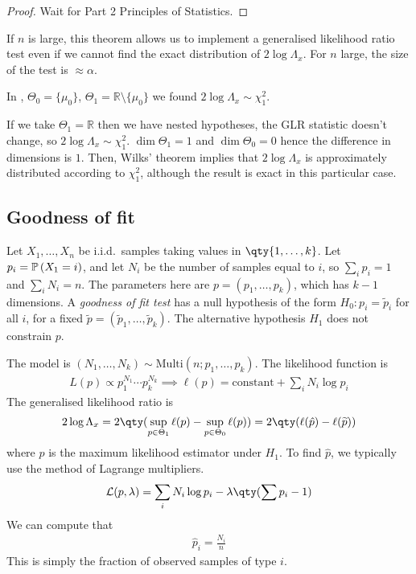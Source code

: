 \begin{proof}
	Wait for Part 2 Principles of Statistics.
\end{proof} 

\begin{remark}
	If $n$ is large, this theorem allows us to implement a generalised likelihood ratio test even if we cannot find the exact distribution of $2 \log \Lambda_x$.
	For $n$ large, the size of the test is $\approx \alpha$.
\end{remark}

\begin{example}
	In , $\Theta_0 = \{\mu_0\}$, $\Theta_1 = \mathbb{R} \setminus \{\mu_0\}$ we found $2 \log \Lambda_x \sim \chi_1^2$.

	If we take $\Theta_1 = \mathbb{R}$ then we have nested hypotheses, the GLR statistic doesn't change, so $2 \log \Lambda_x \sim \chi_1^2$.
	$\dim \Theta_1 = 1$ and $\dim \Theta_0 = 0$ hence the difference in dimensions is $1$.
	Then, Wilks' theorem implies that $2 \log \Lambda_x$ is approximately distributed according to $\chi_1^2$, although the result is exact in this particular case.
\end{example}

\subsection{Goodness of fit}
Let $X_1, \dots, X_n$ be i.i.d.\ samples taking values in $\qty{1, \dots, k}$.
Let $p_i = \mathbb{P}\left({X_1 = i}\right)$, and let $N_i$ be the number of samples equal to $i$, so $\sum_i p_i = 1$ and $\sum_i N_i = n$.
The parameters here are $p = (p_1, \dots, p_k)$, which has $k - 1$ dimensions.
A \textit{goodness of fit test} has a null hypothesis of the form $H_0 \colon p_i = \widetilde p_i$ for all $i$, for a fixed $\widetilde p = (\widetilde p_1, \dots, \widetilde p_k)$.
The alternative hypothesis $H_1$ does not constrain $p$.

The model is $(N_1, \dots, N_k) \sim \mathrm{Multi}(n; p_1, \dots, p_k)$.
The likelihood function is
\begin{align*}
	L(p) \propto p_1^{N_1} \cdots p_k^{N_k} \implies \ell(p) = \text{constant} + \sum_i N_i \log p_i
\end{align*}
The generalised likelihood ratio is
\begin{align*}
	2 \log \Lambda_x = 2\qty(\sup_{p \in \Theta_1} \ell(p) - \sup_{p \in \Theta_0} \ell(p)) = 2\qty(\ell(\hat p) - \ell(\widetilde p))
\end{align*}
where $\hat p$ is the maximum likelihood estimator under $H_1$.
To find $\hat p$, we typically use the method of Lagrange multipliers.
\begin{align*}
	\mathcal L(p, \lambda) = \sum_i N_i \log p_i - \lambda \qty(\sum p_i - 1)
\end{align*}
We can compute that
\begin{align*}
	\hat p_i = \frac{N_i}{n}
\end{align*}
This is simply the fraction of observed samples of type $i$.

